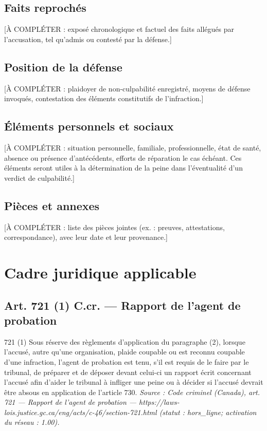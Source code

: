\documentclass[12pt,a4paper]{article}
\begin{document}
\subsection*{Faits reprochés}
[À COMPLÉTER : exposé chronologique et factuel des faits allégués par
l'accusation, tel qu'admis ou contesté par la défense.]

\subsection*{Position de la défense}
[À COMPLÉTER : plaidoyer de non-culpabilité enregistré, moyens de défense
invoqués, contestation des éléments constitutifs de l'infraction.]

\subsection*{Éléments personnels et sociaux}
[À COMPLÉTER : situation personnelle, familiale, professionnelle, état de
santé, absence ou présence d'antécédents, efforts de réparation le cas
échéant. Ces éléments seront utiles à la détermination de la peine dans
l'éventualité d'un verdict de culpabilité.]

\subsection*{Pièces et annexes}
[À COMPLÉTER : liste des pièces jointes (ex. : preuves, attestations,
correspondance), avec leur date et leur provenance.]


\section{Cadre juridique applicable}
\subsection*{Art. 721 (1) C.cr. — Rapport de l'agent de probation}
721 (1) Sous réserve des règlements d'application du paragraphe (2), lorsque l'accusé, autre qu'une organisation, plaide coupable ou est reconnu coupable d'une infraction, l'agent de probation est tenu, s'il est requis de le faire par le tribunal, de préparer et de déposer devant celui-ci un rapport écrit concernant l'accusé afin d'aider le tribunal à infliger une peine ou à décider si l'accusé devrait être absous en application de l'article 730.
\emph{Source : Code criminel (Canada), art. 721 — Rapport de l'agent de probation — https://laws-lois.justice.gc.ca/eng/acts/c-46/section-721.html (statut : hors\_ligne; activation du réseau : 1.00).}
\end{document}
